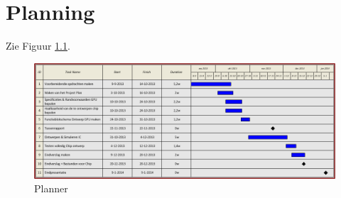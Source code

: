 \documentclass{scrreprt} %
\date{22 november 2013}
\begin{document}
\chapter{Planning}
Zie Figuur \ref{fig:planner}.
\begin{figure}[H]
\centering
        \includegraphics[width=\linewidth]{resources/planner.png}
        \caption{Planner}
        \label{fig:planner}
\end{figure}
\end{document}
